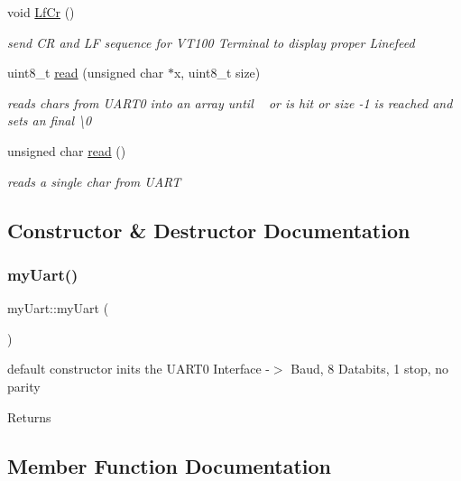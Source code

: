 \begin{DoxyCompactItemize}
void \hyperlink{classmy_uart_a08971c41f424a701504cec9e2751aa49}{Lf\+Cr} ()
\begin{DoxyCompactList}\small\item\em send CR and LF sequence for V\+T100 Terminal to display proper Linefeed \end{DoxyCompactList}\item 
uint8\+\_\+t \hyperlink{classmy_uart_a29fd0034f6c7cd8612614dd85cc6f48d}{read} (unsigned char $\ast$x, uint8\+\_\+t size)
\begin{DoxyCompactList}\small\item\em reads chars from U\+A\+R\+T0 into an array until ~\newline
 or  is hit or size -\/1 is reached and sets an final \textbackslash{}0 \end{DoxyCompactList}\item 
unsigned char \hyperlink{classmy_uart_a65ccd1b10b9b11617a39890265052338}{read} ()
\begin{DoxyCompactList}\small\item\em reads a single char from U\+A\+RT \end{DoxyCompactList}\end{DoxyCompactItemize}


\subsection{Constructor \& Destructor Documentation}
\mbox{\label{classmy_uart_a1f58c3b9bd581805e64120e1c03a83af}} 
\subsubsection{\texorpdfstring{my\+Uart()}{myUart()}}
{\footnotesize\ttfamily my\+Uart\+::my\+Uart (\begin{DoxyParamCaption}{ }\end{DoxyParamCaption})}



default constructor inits the U\+A\+R\+T0 Interface -\/$>$ Baud, 8 Databits, 1 stop, no parity 

\begin{DoxyReturn}{Returns}

\end{DoxyReturn}


\subsection{Member Function Documentation}
\mbox{\label{classmy_uart_a616b3ffa4c6e27ffadeefdd40b08d19f}} 
